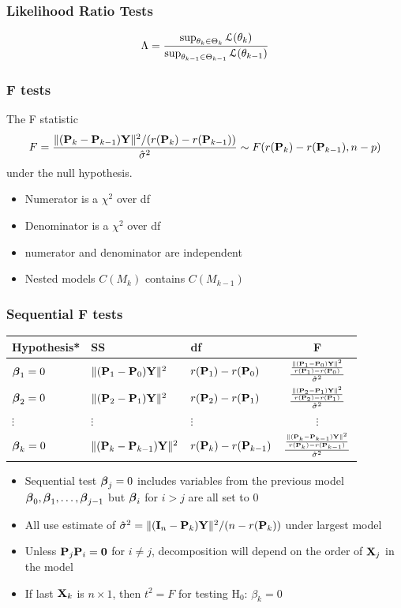 \documentclass[handout]{beamer}
\begin{document}
\begin{frame} \frametitle{Likelihood Ratio Tests}

$$\Lambda = \frac { \sup_{\theta_{k} \in \Theta_{k}} \cL(\theta_{k})}  { \sup_{\theta_{k-1} \in \Theta_{k-1}} \cL(\theta_{k-1})}$$
\vspace{3in}

\end{frame}

\begin{frame}
  \frametitle{F tests}
The F statistic
$$F =  \frac{\| (\P_k - \P_{k-1})\Y \|^2 /(r(\P_{k}) - r(\P_{k-1})) }
{\hat{\sigma}^2} \sim F( r(\P_{k}) - r(\P_{k-1}),  n - p)$$
under the null hypothesis.\pause
\begin{itemize}
\item Numerator is a $\chi^2$ over df \pause
\item Denominator is a $\chi^2$ over df \pause
\item numerator and denominator are independent \pause

\item Nested models $C(M_k)$ contains $C(M_{k-1})$ \pause
\end{itemize}
\end{frame}

\begin{frame}
  \frametitle{Sequential F tests}

  \begin{tabular}{lllc} \hline
    Hypothesis* & SS & df & F \\ \hline
$\b_1 = 0$ & $\| (\P_1 - \P_0) \Y \|^2$ & $r(\P_1) - r(\P_0)$ & $
\frac{\frac{\| (\P_1 - \P_0) \Y \|^2} {r(\P_1) - r(\P_0) }}{\shat}$
\pause \\
$\b_2 = 0$ & $\| (\P_2 - \P_1) \Y \|^2$ & $r(\P_2) - r(\P_1)$ & $ \frac{\frac{\| (\P_
2 - \P_1) \Y \|^2} {r(\P_2) - r(\P_1) }}{\shat}$  \pause \\
$\vdots$ &$\vdots$ & $\vdots$& $\vdots$ \\
 $\b_k = 0$ & $\| (\P_k - \P_{k-1}) \Y \|^2$ & $r(\P_k) - r(\P_{k-1})$ & $ \frac{\frac{\| (\P_
k - \P_{k-1}) \Y \|^2} {r(\P_k) - r(\P_{k-1}) }}{\shat}$  \pause
  \end{tabular}
  \begin{itemize}
  \item Sequential test $\b_j = 0$ includes variables from the
    previous model $\b_0, \b_1,\ldots, \b_{j-1}$ but $\b_i$ for $i >
    j$ are all set to $0$  \pause
  \item All use estimate of $\shat =  \|(\I_n -
    \P_k)\Y\|^2 /(n - r(\P_k))$ under largest model
 \pause
  \item Unless $\P_j\P_i = \zero$ for $i \neq j$, decomposition will
    depend on the order of $\X_j$ in the model  \pause
  \item If last $\X_k$ is $n\times 1$, then $t^2 = F$  for testing H$_0$:
    $\beta_k = 0$  \pause
  \end{itemize}
\end{frame}
\end{document}
